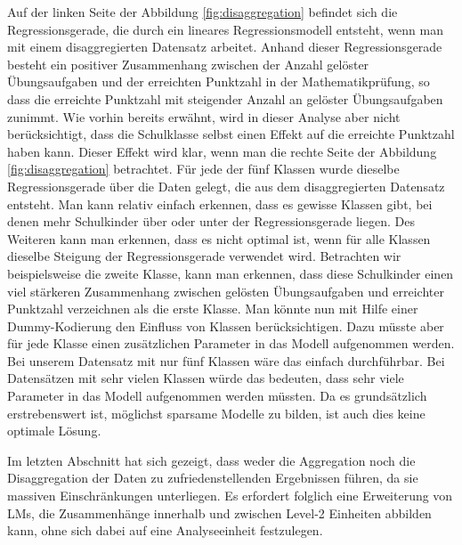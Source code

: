\documentclass[12pt]{article}\usepackage[]{graphicx}\usepackage[]{color}
\begin{document}
Auf der linken Seite der Abbildung \ref{fig:disaggregation} befindet sich die Regressionsgerade, die durch ein lineares Regressionsmodell entsteht, wenn man mit einem disaggregierten Datensatz arbeitet. Anhand dieser Regressionsgerade besteht ein positiver Zusammenhang zwischen der Anzahl gelöster Übungsaufgaben und der erreichten Punktzahl in der Mathematikprüfung, so dass die erreichte Punktzahl mit steigender Anzahl an gelöster Übungsaufgaben zunimmt. Wie vorhin bereits erwähnt, wird in dieser Analyse aber nicht berücksichtigt, dass die Schulklasse selbst einen Effekt auf die erreichte Punktzahl haben kann. Dieser Effekt wird klar, wenn man die rechte Seite der Abbildung \ref{fig:disaggregation} betrachtet. Für jede der fünf Klassen wurde dieselbe Regressionsgerade über die Daten gelegt, die aus dem disaggregierten Datensatz entsteht. Man kann relativ einfach erkennen, dass es gewisse Klassen gibt, bei denen mehr Schulkinder über oder unter der Regressionsgerade liegen. Des Weiteren kann man erkennen, dass es nicht optimal ist, wenn für alle Klassen dieselbe Steigung der Regressionsgerade verwendet wird. Betrachten wir beispielsweise die zweite Klasse, kann man erkennen, dass diese Schulkinder einen viel stärkeren Zusammenhang zwischen gelösten Übungsaufgaben und erreichter Punktzahl verzeichnen als die erste Klasse. Man könnte nun mit Hilfe einer Dummy-Kodierung den Einfluss von Klassen berücksichtigen. Dazu müsste aber für jede Klasse einen zusätzlichen Parameter in das Modell aufgenommen werden. Bei unserem Datensatz mit nur fünf Klassen wäre das einfach durchführbar. Bei Datensätzen mit sehr vielen Klassen würde das bedeuten, dass sehr viele Parameter in das Modell aufgenommen werden müssten. Da es grundsätzlich erstrebenswert ist, möglichst sparsame Modelle zu bilden, ist auch dies keine optimale Lösung. 

Im letzten Abschnitt hat sich gezeigt, dass weder die Aggregation noch die Disaggregation der Daten zu zufriedenstellenden Ergebnissen führen, da sie massiven Einschränkungen unterliegen. Es erfordert folglich eine Erweiterung von LMs, die Zusammenhänge innerhalb und zwischen Level-2 Einheiten abbilden kann, ohne sich dabei auf eine Analyseeinheit festzulegen.
\end{document}
